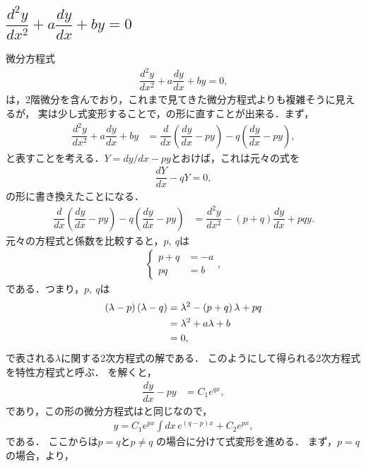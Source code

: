 \subsection{$\dfrac{d^2y}{dx^2} + a \dfrac{dy}{dx} + by = 0$\label{sec:PDE_04}}
%
微分方程式
\begin{align}
  \dfrac{d^2y}{dx^2} + a \dfrac{dy}{dx} + by = 0, \label{eq:PDE_04}
\end{align}
は，2階微分を含んでおり，これまで見てきた微分方程式よりも複雑そうに見えるが，
実は少し式変形することで，の形に直すことが出来る．まず，
\begin{align}
  \dfrac{d^{2}y}{dx^{2}}+a\dfrac{dy}{dx}+by & =\dfrac{d}{dx}\left(\dfrac{dy}{dx}-py\right)-q\left(\dfrac{dy}{dx}-py\right),
\end{align}
と表すことを考える．$Y = dy/dx - py$とおけば，これは元々の式を
\begin{align}
  \dfrac{dY}{dx} - qY = 0, \label{eq:PDE_04_convert} 
\end{align}
の形に書き換えたことになる．
\begin{align}
  \dfrac{d}{dx}\left(\dfrac{dy}{dx}-py\right)-q\left(\dfrac{dy}{dx}-py\right) & =\dfrac{d^{2}y}{dx^{2}}-\left(p+q\right)\dfrac{dy}{dx}+pqy.
\end{align}
元々の方程式と係数を比較すると，$p,~q$は
\begin{align}
  \begin{cases}
    p + q &= -a \\
    pq    &= b 
  \end{cases},
\end{align}
である．つまり，$p,~q$は
\begin{align}
  \left(\lambda-p\right)\left(\lambda-q\right) & =\lambda^{2}-\left(p+q\right)\lambda+pq\notag\\
   & =\lambda^{2}+a\lambda+b\notag\\
   & =0,
\end{align}
で表される$\lambda$に関する2次方程式の解である．
このようにして得られる2次方程式を特性方程式と呼ぶ．
を解くと，
\begin{align}
  \dfrac{dy}{dx} - py & = C_{1}e^{qx},
\end{align}
であり，この形の微分方程式はと同じなので，
\begin{align}
y = C_{1}e^{px}\int dx\, e^{\left(q-p\right)x} + C_{2}e^{px}, \label{eq:PDE_04_sol_general} 
\end{align}
である．
ここからは$p = q$と$p\neq q$ の場合に分けて式変形を進める．
まず，$p=q$の場合，より，
